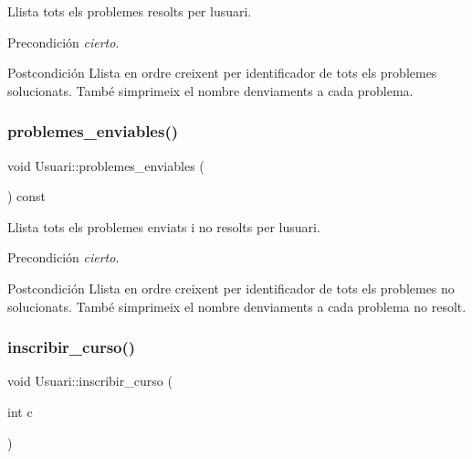 Llista tots els problemes resolts per l\textquotesingle{}usuari. 

\begin{DoxyPrecond}{Precondición}
{\itshape cierto}. 
\end{DoxyPrecond}
\begin{DoxyPostcond}{Postcondición}
Llista en ordre creixent per identificador de tots els problemes solucionats. També s\textquotesingle{}imprimeix el nombre d\textquotesingle{}enviaments a cada problema. 
\end{DoxyPostcond}
\mbox{\label{class_usuari_a84e0532f6b7ae4c4022e4739ca7abade}} 
\subsubsection{\texorpdfstring{problemes\+\_\+enviables()}{problemes\_enviables()}}
{\footnotesize\ttfamily void Usuari\+::problemes\+\_\+enviables (\begin{DoxyParamCaption}{ }\end{DoxyParamCaption}) const}



Llista tots els problemes enviats i no resolts per l\textquotesingle{}usuari. 

\begin{DoxyPrecond}{Precondición}
{\itshape cierto}. 
\end{DoxyPrecond}
\begin{DoxyPostcond}{Postcondición}
Llista en ordre creixent per identificador de tots els problemes no solucionats. També s\textquotesingle{}imprimeix el nombre d\textquotesingle{}enviaments a cada problema no resolt. 
\end{DoxyPostcond}
\mbox{\label{class_usuari_af7f2d183e02eec8428bf48df89efb763}} 
\subsubsection{\texorpdfstring{inscribir\+\_\+curso()}{inscribir\_curso()}}
{\footnotesize\ttfamily void Usuari\+::inscribir\+\_\+curso (\begin{DoxyParamCaption}\item[{int}]{c }\end{DoxyParamCaption})}



